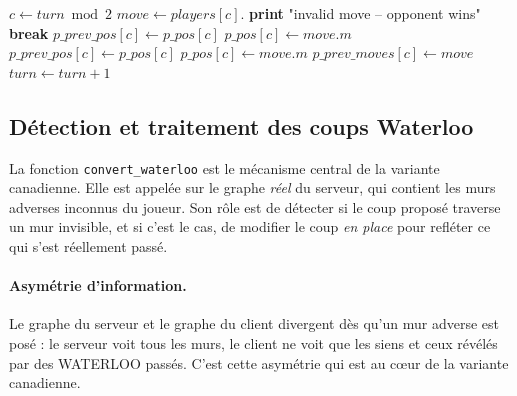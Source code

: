 \documentclass[12pt,a4paper]{article}
\begin{document}
\begin{algorithm}
\caption{Main game loop}
\begin{algorithmic}[1]
    \State $c \gets turn \bmod 2$
    \State $move \gets players[c].$
        \State \textbf{print} "invalid move -- opponent wins"
        \State \textbf{break}
    \EndIf
        \State {} 
        \State $p\_prev\_pos[c] \gets p\_pos[c]$
        \State $p\_pos[c] \gets move.m$
        \State {}
            \State $p\_prev\_pos[c] \gets p\_pos[c]$
            \State $p\_pos[c] \gets move.m$
            \State {}
        \EndIf
            \State {}
        \EndIf
    \EndIf
    \State $p\_prev\_moves[c] \gets move$
    \State $turn \gets turn + 1$
\EndWhile
\end{algorithmic}
\end{algorithm}

\subsection{Détection et traitement des coups Waterloo}

La fonction \texttt{convert\_waterloo} est le mécanisme central de la variante
canadienne. Elle est appelée sur le graphe \textit{réel} du serveur, qui contient
les murs adverses inconnus du joueur. Son rôle est de détecter si le coup proposé
traverse un mur invisible, et si c'est le cas, de modifier le coup \textit{en place}
pour refléter ce qui s'est réellement passé.

\paragraph{Asymétrie d'information.} Le graphe du serveur et le graphe du client
divergent dès qu'un mur adverse est posé : le serveur voit tous les murs, le client
ne voit que les siens et ceux révélés par des WATERLOO passés. C'est cette
asymétrie qui est au cœur de la variante canadienne.
\end{document}
